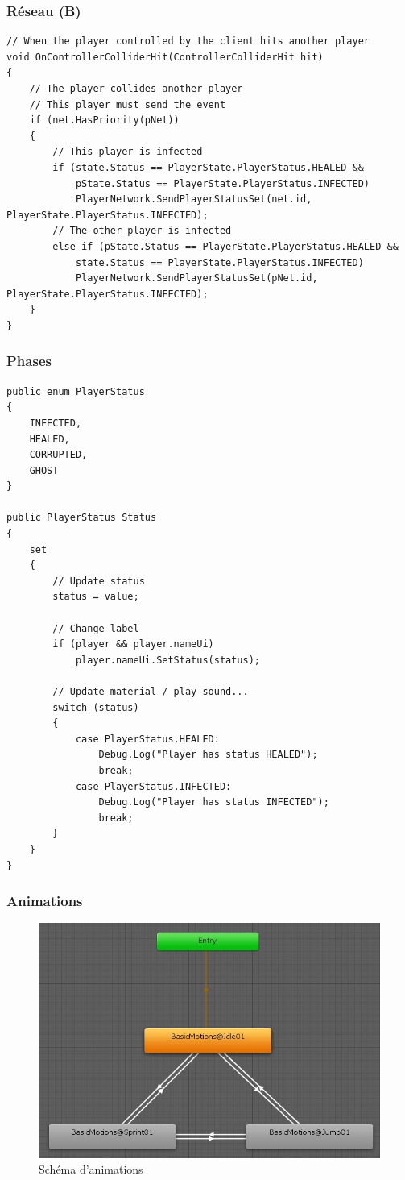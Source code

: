\documentclass{article}
\begin{document}
\subsubsection{Réseau (B)}
\label{NetB}
\begin{lstlisting}
// When the player controlled by the client hits another player
void OnControllerColliderHit(ControllerColliderHit hit)
{
    // The player collides another player
    // This player must send the event
    if (net.HasPriority(pNet))
    {
        // This player is infected
        if (state.Status == PlayerState.PlayerStatus.HEALED &&
            pState.Status == PlayerState.PlayerStatus.INFECTED)
            PlayerNetwork.SendPlayerStatusSet(net.id, PlayerState.PlayerStatus.INFECTED);
        // The other player is infected
        else if (pState.Status == PlayerState.PlayerStatus.HEALED &&
            state.Status == PlayerState.PlayerStatus.INFECTED)
            PlayerNetwork.SendPlayerStatusSet(pNet.id, PlayerState.PlayerStatus.INFECTED);
    }
}
\end{lstlisting}


\subsubsection{Phases}
\label{PhaseA}
\begin{lstlisting}
public enum PlayerStatus
{
    INFECTED,
    HEALED,
    CORRUPTED,
    GHOST
}

public PlayerStatus Status
{
    set
    {
        // Update status
        status = value;

        // Change label
        if (player && player.nameUi)
            player.nameUi.SetStatus(status);

        // Update material / play sound...
        switch (status)
        {
            case PlayerStatus.HEALED:
                Debug.Log("Player has status HEALED");
                break;
            case PlayerStatus.INFECTED:
                Debug.Log("Player has status INFECTED");
                break;
        }
    }
}
\end{lstlisting}

\subsubsection{Animations}
\label{Animations}

\begin{figure}[h]
	\includegraphics[width=1\textwidth]{anim.jpg}
	\caption{Schéma d'animations}
\end{figure}



\newpage
\end{document}
